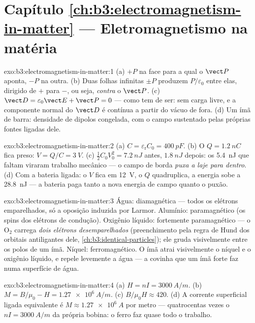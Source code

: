 \section*{Capítulo \ref{ch:b3:electromagnetism-in-matter} --- Eletromagnetismo na matéria}

\begin{solution}{exo:b3:electromagnetism-in-matter:1}
(a) $+P$ na face para a qual o $\vect P$ aponta, $-P$ na outra. (b)
Duas folhas infinitas $\pm P$ produzem $P/\varepsilon_0$ entre elas,
dirigido de $+$ para $-$, ou seja, \emph{contra} o $\vect P$. (c)
$\vect D = \varepsilon_0\vect E + \vect P = 0$ --- como tem de ser:
sem carga livre, e a componente normal do $\vect D$ é contínua a partir
do vácuo de fora. (d) Um ímã de barra: densidade de dipolos congelada,
com o campo sustentado pelas próprias fontes ligadas dele.
\end{solution}

\begin{solution}{exo:b3:electromagnetism-in-matter:2}
(a) $C = \varepsilon_{\text{r}}C_0 = \qty{400}{pF}$. (b) O $Q =
\qty{1.2}{nC}$ fica preso: $V = Q/C = \qty{3}{V}$. (c)
$\tfrac12C_0V_0^2 = \qty{7.2}{nJ}$ antes, $\qty{1.8}{nJ}$ depois:
os \qty{5.4}{nJ} que faltam viraram trabalho mecânico --- o campo de
borda \emph{puxa a laje para dentro}. (d) Com a bateria ligada: o $V$
fica em \qty{12}{V}, o $Q$ quadruplica, a energia sobe a \qty{28.8}{nJ}
--- a bateria paga tanto a nova energia de campo quanto o puxão.
\end{solution}

\begin{solution}{exo:b3:electromagnetism-in-matter:3}
Água: diamagnética --- todos os elétrons emparelhados, só a oposição
induzida por Larmor. Alumínio: paramagnético (os spins dos elétrons de condução).
Oxigênio líquido: fortemente paramagnético --- o O$_2$ carrega \emph{dois
elétrons desemparelhados} (preenchimento pela regra de Hund dos
orbitais antiligantes dele, \cref{ch:b3:identical-particles}); ele gruda
visivelmente entre os polos de um ímã. Níquel: ferromagnético. O ímã
atrai visivelmente o níquel e o oxigênio líquido, e repele
levemente a água --- a covinha que um ímã forte faz numa superfície de água.
\end{solution}

\begin{solution}{exo:b3:electromagnetism-in-matter:4}
(a) $H = nI = \qty{3000}{A/m}$. (b) $M = B/\mu_0 - H =
\qty{1.27e6}{A/m}$. (c) $B/\mu_0H \approx 420$. (d) A
corrente superficial ligada equivalente é $M \approx \qty{1.27e6}{A}$ por
metro --- quatrocentas vezes o $nI = \qty{3000}{A/m}$ da própria bobina:
o ferro faz quase todo o trabalho.
\end{solution}

